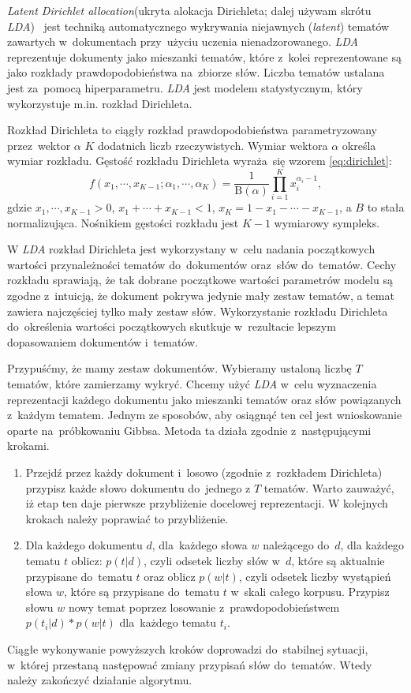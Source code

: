 \documentclass[pl]{minipw} %
\begin{document}
\textit{Latent Dirichlet allocation}(ukryta alokacja Dirichleta; dalej używam skrótu  \textit{LDA})~\cite{lda} jest techniką automatycznego wykrywania niejawnych (\textit{latent}) tematów zawartych w~dokumentach przy~użyciu uczenia nienadzorowanego. \textit{LDA} reprezentuje dokumenty jako mieszanki tematów, które z~kolei reprezentowane są jako rozkłady prawdopodobieństwa na~zbiorze słów. Liczba tematów ustalana jest za~pomocą hiperparametru. \textit{LDA} jest modelem statystycznym, który wykorzystuje m.in. rozkład Dirichleta. 

Rozkład Dirichleta to ciągły rozkład prawdopodobieństwa parametryzowany przez~wektor $\alpha$ $K$ dodatnich liczb rzeczywistych. Wymiar wektora $\alpha$ określa wymiar rozkładu. Gęstość rozkładu Dirichleta wyraża~się wzorem \ref{eq:dirichlet}: 
\begin{equation}
\label{eq:dirichlet}
f\left(x_{1},\cdots ,x_{K-1};\alpha _{1},\cdots ,\alpha _{K}\right)={\frac {1}{\mathrm {B} (\alpha )}}\prod _{i=1}^{K}x_{i}^{\alpha _{i}-1},
\end{equation}
gdzie $ x_{1},\cdots ,x_{K-1}>0$, $x_{1}+\cdots +x_{K-1}<1$, $x_{K}=1-x_{1}-\cdots -x_{K-1}$, a $B$ to stała normalizująca. Nośnikiem gęstości rozkładu jest $K-1$ wymiarowy sympleks.

W \textit{LDA} rozkład Dirichleta jest wykorzystany w~celu nadania początkowych wartości przynależności tematów do~dokumentów oraz~słów do~tematów. Cechy rozkładu sprawiają, że tak dobrane początkowe wartości parametrów modelu są zgodne z~intuicją, że dokument pokrywa jedynie mały zestaw tematów, a temat zawiera najczęściej tylko mały zestaw słów. Wykorzystanie rozkładu Dirichleta do~określenia wartości początkowych skutkuje w~rezultacie lepszym dopasowaniem dokumentów i~tematów.

Przypuśćmy, że mamy zestaw dokumentów. Wybieramy ustaloną liczbę $T$ tematów, które zamierzamy wykryć. Chcemy użyć \textit{LDA} w~celu wyznaczenia reprezentacji każdego dokumentu jako mieszanki tematów oraz słów powiązanych z~każdym tematem. Jednym ze sposobów, aby osiągnąć ten cel jest wnioskowanie oparte na~próbkowaniu Gibbsa. Metoda ta działa zgodnie z~następującymi krokami.

\begin{enumerate}
	\item Przejdź przez każdy dokument i~losowo (zgodnie z~rozkładem Dirichleta) przypisz każde słowo dokumentu do~jednego z $T$ tematów.
	Warto zauważyć, iż etap ten daje pierwsze przybliżenie docelowej reprezentacji. W kolejnych krokach należy poprawiać to przybliżenie.
	\item Dla każdego dokumentu $d$, dla~każdego słowa $w$ należącego do~$d$, dla każdego tematu $t$ oblicz: $p(t | d)$, czyli odsetek liczby słów w~$d$, które są aktualnie przypisane do~tematu $t$ oraz oblicz $p(w | t)$, czyli odsetek liczby wystąpień słowa $w$, które są przypisane do~tematu $t$ w~skali całego korpusu. Przypisz słowu $w$ nowy temat poprzez losowanie z~prawdopodobieństwem $p(t_i|d)*p(w|t)$ dla~każdego tematu $t_i$.
\end{enumerate}
Ciągłe wykonywanie powyższych kroków doprowadzi do~stabilnej sytuacji, w~której przestaną następować zmiany przypisań słów do~tematów. Wtedy należy zakończyć działanie algorytmu.
\end{document}
